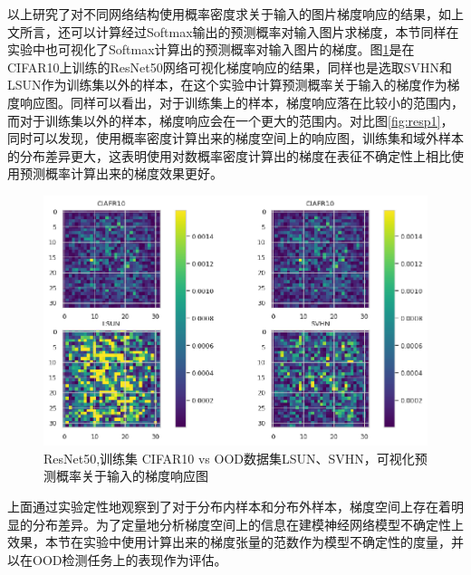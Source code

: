 以上研究了对不同网络结构使用概率密度求关于输入的图片梯度响应的结果，如上文所言，还可以计算经过Softmax输出的预测概率对输入图片求梯度，本节同样在实验中也可视化了Softmax计算出的预测概率对输入图片的梯度。图\ref{fig:resp3}是在CIFAR10上训练的ResNet50网络可视化梯度响应的结果，同样也是选取SVHN和LSUN作为训练集以外的样本，在这个实验中计算预测概率关于输入的梯度作为梯度响应图。同样可以看出，对于训练集上的样本，梯度响应落在比较小的范围内，而对于训练集以外的样本，梯度响应会在一个更大的范围内。对比图\ref{fig:resp1}，同时可以发现，使用概率密度计算出来的梯度空间上的响应图，训练集和域外样本的分布差异更大，这表明使用对数概率密度计算出的梯度在表征不确定性上相比使用预测概率计算出来的梯度效果更好。
\begin{figure}[h]
    \captionsetup{font=small, justification=centering}
    \centering
    \includegraphics[width=0.75\linewidth]{assets/3-3.png}
    \caption{ResNet50,训练集 CIFAR10 vs OOD数据集LSUN、SVHN，可视化预测概率关于输入的梯度响应图
}
    \label{fig:resp3}
\end{figure}


上面通过实验定性地观察到了对于分布内样本和分布外样本，梯度空间上存在着明显的分布差异。为了定量地分析梯度空间上的信息在建模神经网络模型不确定性上效果，本节在实验中使用计算出来的梯度张量的范数作为模型不确定性的度量，并以在OOD检测任务上的表现作为评估。

